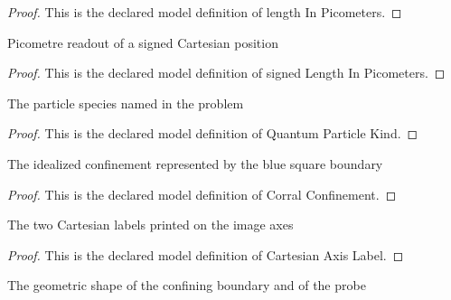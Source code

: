 \begin{proof}
  This is the declared model definition of length In Picometers.
\end{proof}
\begin{definition}
  \label{def:physics:phyx-mini-0583:phyxminiproblems-problemphyxmini0583-signedlengthinpicometers}
  Picometre readout of a signed Cartesian position
\end{definition}
\begin{proof}
  This is the declared model definition of signed Length In Picometers.
\end{proof}
\begin{definition}
  \label{def:physics:phyx-mini-0583:phyxminiproblems-problemphyxmini0583-quantumparticlekind}
  The particle species named in the problem
\end{definition}
\begin{proof}
  This is the declared model definition of Quantum Particle Kind.
\end{proof}
\begin{definition}
  \label{def:physics:phyx-mini-0583:phyxminiproblems-problemphyxmini0583-corralconfinement}
  The idealized confinement represented by the blue square boundary
\end{definition}
\begin{proof}
  This is the declared model definition of Corral Confinement.
\end{proof}
\begin{definition}
  \label{def:physics:phyx-mini-0583:phyxminiproblems-problemphyxmini0583-cartesianaxislabel}
  The two Cartesian labels printed on the image axes
\end{definition}
\begin{proof}
  This is the declared model definition of Cartesian Axis Label.
\end{proof}
\begin{definition}
  \label{def:physics:phyx-mini-0583:phyxminiproblems-problemphyxmini0583-figureshape}
  The geometric shape of the confining boundary and of the probe
\end{definition}
